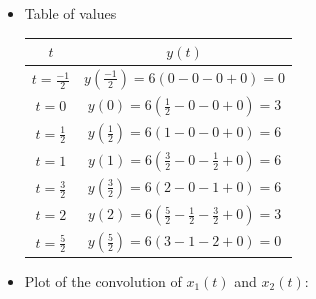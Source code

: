 \documentclass[a4paper, 12pt]{article}
\begin{document}
\begin{itemize}
\begin{itemize}
\begin{itemize}
\begin{equation}
\begin{gathered}
\begin{alignedat}{1}
y^{''}(t) &= 6\left[ \delta \left(t + \frac{1}{2} \right) - \delta \left(t - \frac{3}{2} \right) - \delta\left( t - \frac{1}{2}\right) + \delta \left(t - \frac{5}{2} \right) \right] \\
y^{'}(t) &= 6\left[ \mathtt{u} \left(t + \frac{1}{2} \right) - \mathtt{u} \left(t - \frac{3}{2} \right) - \mathtt{u}\left( t - \frac{1}{2}\right) + \mathtt{u} \left(t - \frac{5}{2} \right) \right] \\
\Aboxed{y(t) &= 6\left[ \mathtt{ramp} \left(t + \frac{1}{2} \right) - \mathtt{ramp} \left(t - \frac{3}{2} \right) - \mathtt{ramp}\left( t - \frac{1}{2}\right) + \mathtt{ramp} \left(t - \frac{5}{2} \right) \right]}
\end{alignedat}
\end{gathered}
\end{equation}
\item[(iii.)]{Table of values}
\begin{center}
\begin{tabular}{|c|c|}
\hline
$t$ & $y(t)$ \\
\hline
$t = \frac{-1}{2}$ & $y\left(\frac{-1}{2}\right) = 6 \left(0 - 0 -0 + 0\right) = 0$\\
\hline
$t = 0$ & $y\left(0\right) = 6 \left(\frac{1}{2} - 0 -0 + 0\right) = 3$ \\
\hline
$t = \frac{1}{2}$ & $y\left(\frac{1}{2}\right) = 6 \left(1 - 0 -0 + 0\right) = 6$ \\
\hline
$t = 1$ & $y\left(1\right) = 6 \left(\frac{3}{2} - 0 -\frac{1}{2} + 0\right) = 6$ \\
\hline
$t = \frac{3}{2}$ & $y\left(\frac{3}{2}\right) = 6 \left(2 - 0 -1 + 0\right) = 6$ \\
\hline
$t = 2$ & $y\left(2\right) = 6 \left(\frac{5}{2} - \frac{1}{2} -\frac{3}{2} + 0\right) = 3$ \\
\hline
$t = \frac{5}{2}$ & $y\left(\frac{5}{2}\right) = 6 \left(3 - 1 -2 + 0\right) = 0$ \\
\hline
\end{tabular}
\end{center}
\item[(iv.)]{Plot of the convolution of $x_{1}(t)$ and $x_{2}(t)$:}
\begin{figure}[h!]

\end{figure}
\end{itemize}
\end{itemize}
\end{itemize}
\end{document}
